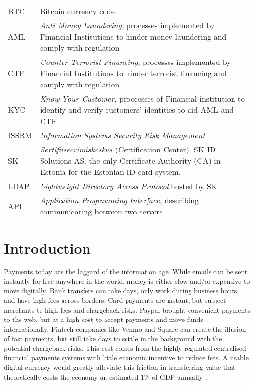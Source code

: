 \documentclass[12pt]{article} %
\begin{document}
\begin{tabular}{p{3 cm} p{10cm}}
BTC & Bitcoin currency code\\
AML & \textit{Anti Money Laundering}, processes implemented by Financial Institutions to hinder money laundering and comply with regulation\\
CTF & \textit{Counter Terrorist Financing}, processes implemented by Financial Institutions to hinder terrorist financing and comply with regulation\\
KYC & \textit{Know Your Customer}, proccesses of Financial institution to identify and verify customers' identities to aid AML and CTF\\
ISSRM & \textit{Information Systems Security Risk Management} \\
SK & \textit{Sertifitseerimiskeskus} (Certification Center), SK ID Solutions AS, the only Certificate Authority (CA) in Estonia for the Estonian ID card system. \\
LDAP & \textit{Lightweight Directory Access Protocol} hosted by SK \\
API & \textit{Application Programming Interface}, describing communicating between two servers
\end{tabular}

\pagebreak

\tableofcontents
\newpage

\listoffigures
\pagebreak

\listoftables
\pagebreak

\section{Introduction} \label{sec:1}

Payments today are the laggard of the information age. While emails can be sent instantly for free anywhere in the world, money is either slow and/or expensive to move digitally. Bank transfers can take days, only work during business hours, and have high fees across borders. Card payments are instant, but subject merchants to high fees and chargeback risks. Paypal brought convenient payments to the web, but at a high cost to accept payments and move funds internationally. Fintech companies like Venmo and Square can create the illusion of fast payments, but still take days to settle in the background with the potential chargeback risks. This cost comes from the highly regulated centralised financial payments systems with little economic incentive to reduce fees. A usable digital currency would greatly alleviate this friction in transferring value that theoretically costs the economy an estimated 1\% of GDP annually \cite{kaarmann2013cost}.
\end{document}

